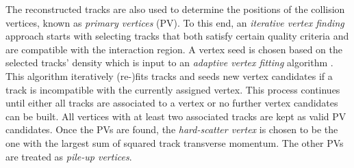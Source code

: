 The reconstructed tracks are also used to determine the positions of the collision vertices, known as \emph{primary vertices} (PV). To this end, an \emph{iterative vertex finding} approach \cite{PERF-2015-01} starts with selecting tracks that both satisfy certain quality criteria and are compatible with the interaction region. A vertex seed is chosen based on the selected tracks' density which is input to an \emph{adaptive vertex fitting} algorithm .
This algorithm iteratively (re-)fits tracks and seeds new vertex candidates if a track is incompatible with the currently assigned vertex.
This process continues until either all tracks are associated to a vertex or no further vertex candidates can be built.
All vertices with at least two associated tracks are kept as valid PV candidates.
Once the PVs are found, the \emph{hard-scatter vertex} is chosen to be the one with the largest sum of squared track transverse momentum. The other PVs are treated as \emph{pile-up vertices}.






